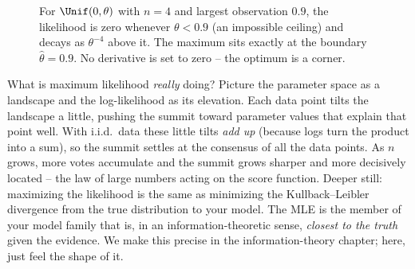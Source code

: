 \begin{figure}[H]
\centering
{}
\caption{For $\Unif(0,\theta)$ with $n=4$ and largest observation $0.9$, the
likelihood is zero whenever $\theta<0.9$ (an impossible ceiling) and decays as
$\theta^{-4}$ above it. The maximum sits exactly at the boundary
$\hat\theta=0.9$. No derivative is set to zero -- the optimum is a corner.}
\label{ch30:fig-unif-lik}
\end{figure}

\begin{happeningbox}
What is maximum likelihood \emph{really} doing? Picture the parameter space as a
landscape and the log-likelihood as its elevation. Each data point tilts the
landscape a little, pushing the summit toward parameter values that explain that
point well. With i.i.d.\ data these little tilts \emph{add up} (because logs
turn the product into a sum), so the summit settles at the consensus of all the
data points. As $n$ grows, more votes accumulate and the summit grows sharper
and more decisively located -- the law of large numbers acting on the score
function. Deeper still: maximizing the likelihood is the same as minimizing the
Kullback--Leibler divergence from the true distribution to your model. The MLE
is the member of your model family that is, in an information-theoretic sense,
\emph{closest to the truth} given the evidence. We make this precise in the
information-theory chapter; here, just feel the shape of it.
\end{happeningbox}

